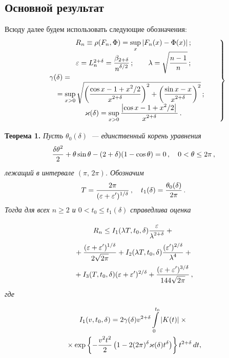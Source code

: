\begin{multicols}{2}
\section{Основной результат}

Всюду далее будем использовать следующие обозначения:
\begin{equation}
\left.
\begin{array}{c}
R_n\equiv\rho(F_n,\Phi)=\displaystyle\sup_x|F_n(x)-\Phi(x)|\,;
\\[6pt]
\eps=L_n^{2+\delta}=\fr{\beta_{2+\delta}}{n^{\delta/2}}\,;\quad
\quad \lambda=\sqrt{\fr{n-1}n}\,;
\\[6pt]
\gamma(\delta)={}\ \ \ \ \ \ \ \ \ \ \ \ \ \ \ \ \ \ \hspace*{50mm} \\
\!\!\!\!\!\!\!\!\!{}=\displaystyle\sup_{x>0}\sqrt{\left(\fr{\cos
x-1+x^2/2}{x^{2+\delta}}\right)^2 + \left(\fr{\sin
x-x}{x^{2+\delta}}\right)^2 }\,;\!\!\!
\\[6pt]
\varkappa(\delta)= \displaystyle\sup_{x>0}\fr{\left|\cos x-1+x^2/2\right|}{x^{2+\delta}}\,.
\end{array}\!
\right \}\!\!\!
\label{eps'_eps''_lambda}
\end{equation}

\smallskip

\noindent
\textbf{Теорема 1.}
\textit{Пусть $\theta_0(\delta)$~--- единственный корень уравнения
$$
\displaystyle\frac{\displaystyle \delta\theta^2\mathstrut}{\displaystyle 2\mathstrut}+\theta\sin \theta - (2+\delta)(1-\cos \theta)=0\,,\quad
0<\theta\le2\pi\,,
$$
лежащий в интервале $(\pi,\,2\pi)$. Обозначим
$$
T=\displaystyle\frac{\displaystyle 2\pi\mathstrut}{\displaystyle (\varepsilon+\varepsilon')^{1/\delta}\mathstrut}\,,\quad t_1(\delta)=
\displaystyle\frac{\displaystyle \theta_0(\delta)\mathstrut}{\displaystyle 2\pi\mathstrut}\,.
$$
Тогда для всех $n\ge2$ и $0<t_0\le t_1(\delta)$ справедлива оценка}

\noindent
\begin{multline*}
R_n\le  I_1(\lambda T,t_0,\delta)\displaystyle\frac{\displaystyle \varepsilon\mathstrut}{\displaystyle \lambda^{2+\delta}\mathstrut}+{}\\
{}+
\displaystyle\frac{\displaystyle (\varepsilon+\varepsilon')^{1/\delta}\mathstrut}{\displaystyle 2\sqrt{2\pi}\mathstrut}
+I_2(\lambda T,t_0,\delta)\displaystyle\frac{\displaystyle (\varepsilon')^{2/\delta}\mathstrut}{\displaystyle \lambda^4\mathstrut} +{} \\
{}+I_3(T,t_0,\delta) (\varepsilon+\varepsilon')^{2/\delta}+
\displaystyle\frac{\displaystyle (\varepsilon+\varepsilon')^{3/\delta}\mathstrut}{\displaystyle 144\sqrt{2\pi}\mathstrut}\,,
\end{multline*}
\textit{где}

\vspace*{-12pt}

\noindent
\begin{multline*}
I_1(v,t_0,\delta)
=2\gamma(\delta)v^{2+\delta}\int\limits_0^{t_0}\left|K(t)\right|\times{}\\
{}\times
\exp\left\{-\displaystyle\frac{\displaystyle v^2t^2\mathstrut}{\displaystyle 2\mathstrut} \left(1-2(2\pi)^\delta\varkappa(\delta)t^{\delta}
\right)\right\} t^{2+\delta}\,dt,
\end{multline*}


\end{multicols}
